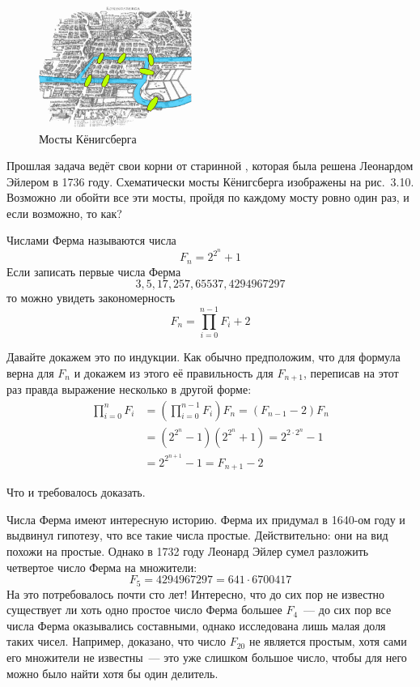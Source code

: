\begin{figure}[H]
\centering
\includegraphics[width=5cm]{images/konigsberg_bridges.png}
\caption{Мосты Кёнигсберга}
\end{figure}

\begin{exercise}
Прошлая задача ведёт свои корни от старинной , которая была решена Леонардом Эйлером в 1736 году. Схематически мосты Кёнигсберга изображены на рис.~3.10. Возможно ли обойти все эти мосты, пройдя по каждому мосту ровно один раз, и если возможно, то как?
\end{exercise}

\begin{example}
Числами Ферма называются числа
$$F_n = 2^{2^n} + 1$$
Если записать первые числа Ферма
$$3, 5, 17, 257, 65537, 4294967297$$
то можно увидеть закономерность
\begin{equation}\label{ni:3}
F_n = \prod_{i=0}^{n-1}F_i + 2
\end{equation}
\end{example}

Давайте докажем это по индукции. Как обычно предположим, что для формула верна для $F_n$ и докажем из этого её правильность для $F_{n+1}$, переписав на этот раз правда выражение несколько в другой форме:
\begin{align*}
\prod_{i=0}^n F_i &= (\prod_{i=0}^{n-1} F_i) F_n = (F_{n - 1} - 2) F_n \\
	&= (2^{2^n} - 1) (2^{2^n} + 1) = 2^{2\cdot 2^n} - 1 \\
	&= 2^{2^{n+1}} - 1 = F_{n+1} - 2
\end{align*}

Что и требовалось доказать.

Числа Ферма имеют интересную историю. Ферма их придумал в 1640-ом году и выдвинул гипотезу, что все такие числа простые. Действительно: они на вид похожи на простые. Однако в 1732 году Леонард Эйлер сумел разложить четвертое число Ферма на множители:
$$F_5 = 4294967297 = 641 \cdot 6700417$$
На это потребовалось почти сто лет! Интересно, что до сих пор не известно существует ли хоть одно простое число Ферма большее $F_4$~--- до сих пор все числа Ферма оказывались составными, однако исследована лишь малая доля таких чисел. Например, доказано, что число $F_{20}$ не является простым, хотя сами его множители не известны~--- это уже слишком большое число, чтобы для него можно было найти хотя бы один делитель.

